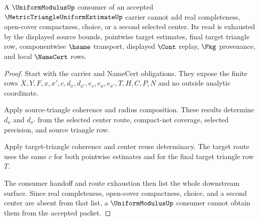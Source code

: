 \begin{theorem}
\label{thm:metric-triangle-uniform-estimate-no-completion-escape}
A $\UniformModulusUp$ consumer of an accepted $\MetricTriangleUniformEstimateUp$ carrier cannot add real completeness, open-cover compactness, choice, or a second selected center. Its read is exhausted by the displayed source bounds, pointwise target estimates, final target triangle row, componentwise $\hsame$ transport, displayed $\Cont$ replay, $\Pkg$ provenance, and local $\NameCert$ rows.
\end{theorem}
\begin{proof}
Start with the carrier and NameCert obligations. They expose the finite rows $X,Y,F,x,x',c,d_x,d_{x'},e_c,e_x,e_{x'},T,H,C,P,N$ and no outside analytic coordinate.

Apply source-triangle coherence and radius composition. These results determine $d_x$ and $d_{x'}$ from the selected center route, compact-net coverage, selected precision, and source triangle row.

Apply target-triangle coherence and center reuse determinacy. The target route uses the same $c$ for both pointwise estimates and for the final target triangle row $T$.

The consumer handoff and route exhaustion then list the whole downstream surface. Since real completeness, open-cover compactness, choice, and a second center are absent from that list, a $\UniformModulusUp$ consumer cannot obtain them from the accepted packet.
\end{proof}

